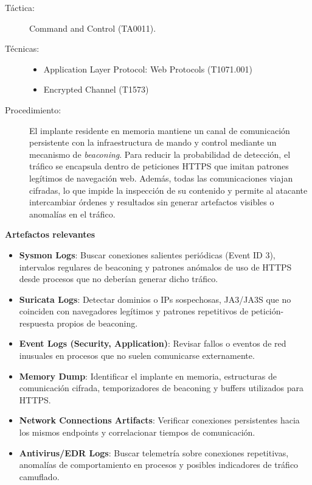 \begin{leftbar}
    \begin{description}
        \item[Táctica:] Command and Control (TA0011).
        \item[Técnicas:]
        \begin{itemize} 
            \item Application Layer Protocol: Web Protocols (T1071.001)
            \item Encrypted Channel (T1573)
        \end{itemize}
        \item[Procedimiento:]  
        El implante residente en memoria mantiene un canal de comunicación persistente con la infraestructura de mando y control mediante un mecanismo de \textit{beaconing}. Para reducir la probabilidad de detección, el tráfico se encapsula dentro de peticiones HTTPS que imitan patrones legítimos de navegación web. Además, todas las comunicaciones viajan cifradas, lo que impide la inspección de su contenido y permite al atacante intercambiar órdenes y resultados sin generar artefactos visibles o anomalías en el tráfico.
    \end{description}
\end{leftbar}

\textbf{Artefactos relevantes}
\begin{itemize}
    \item \textbf{Sysmon Logs}: Buscar conexiones salientes periódicas (Event ID 3), intervalos regulares de beaconing y patrones anómalos de uso de HTTPS desde procesos que no deberían generar dicho tráfico.
    \item \textbf{Suricata Logs}: Detectar dominios o IPs sospechosas, JA3/JA3S que no coinciden con navegadores legítimos y patrones repetitivos de petición-respuesta propios de beaconing.
    \item \textbf{Event Logs (Security, Application)}: Revisar fallos o eventos de red inusuales en procesos que no suelen comunicarse externamente.
    \item \textbf{Memory Dump}: Identificar el implante en memoria, estructuras de comunicación cifrada, temporizadores de beaconing y buffers utilizados para HTTPS.
    \item \textbf{Network Connections Artifacts}: Verificar conexiones persistentes hacia los mismos endpoints y correlacionar tiempos de comunicación.
    \item \textbf{Antivirus/EDR Logs}: Buscar telemetría sobre conexiones repetitivas, anomalías de comportamiento en procesos y posibles indicadores de tráfico camuflado.
\end{itemize}

